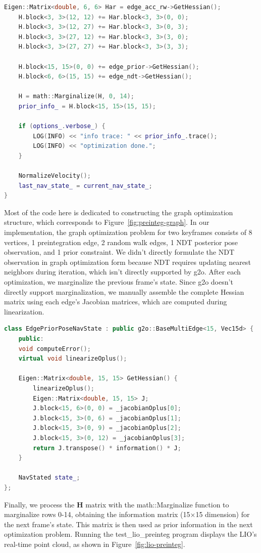 \begin{lstlisting}[language=c++,caption=src/ch8/lio-preinteg/lio_preinteg.cc]
	Eigen::Matrix<double, 6, 6> Har = edge_acc_rw->GetHessian();
	H.block<3, 3>(12, 12) += Har.block<3, 3>(0, 0);
	H.block<3, 3>(12, 27) += Har.block<3, 3>(0, 3);
	H.block<3, 3>(27, 12) += Har.block<3, 3>(3, 0);
	H.block<3, 3>(27, 27) += Har.block<3, 3>(3, 3);
	
	H.block<15, 15>(0, 0) += edge_prior->GetHessian();
	H.block<6, 6>(15, 15) += edge_ndt->GetHessian();
	
	H = math::Marginalize(H, 0, 14);
	prior_info_ = H.block<15, 15>(15, 15);
	
	if (options_.verbose_) {
		LOG(INFO) << "info trace: " << prior_info_.trace();
		LOG(INFO) << "optimization done.";
	}
	
	NormalizeVelocity();
	last_nav_state_ = current_nav_state_;
}
\end{lstlisting}

Most of the code here is dedicated to constructing the graph optimization structure, which corresponds to Figure~\ref{fig:preinteg-graph}. In our implementation, the graph optimization problem for two keyframes consists of 8 vertices, 1 preintegration edge, 2 random walk edges, 1 NDT posterior pose observation, and 1 prior constraint. We didn't directly formulate the NDT observation in graph optimization form because NDT requires updating nearest neighbors during iteration, which isn't directly supported by g2o. After each optimization, we marginalize the previous frame's state. Since g2o doesn't directly support marginalization, we manually assemble the complete Hessian matrix using each edge's Jacobian matrices, which are computed during linearization.

\begin{lstlisting}[language=c++,caption=src/common/g2o_types.h]
class EdgePriorPoseNavState : public g2o::BaseMultiEdge<15, Vec15d> {
	public:
	void computeError();
	virtual void linearizeOplus();
	
	Eigen::Matrix<double, 15, 15> GetHessian() {
		linearizeOplus();
		Eigen::Matrix<double, 15, 15> J;
		J.block<15, 6>(0, 0) = _jacobianOplus[0];
		J.block<15, 3>(0, 6) = _jacobianOplus[1];
		J.block<15, 3>(0, 9) = _jacobianOplus[2];
		J.block<15, 3>(0, 12) = _jacobianOplus[3];
		return J.transpose() * information() * J;
	}
	
	NavStated state_;
};
\end{lstlisting}

Finally, we process the $\mathbf{H}$ matrix with the math::Marginalize function to marginalize rows 0-14, obtaining the information matrix (15×15 dimension) for the next frame's state. This matrix is then used as prior information in the next optimization problem. Running the test\_lio\_preinteg program displays the LIO's real-time point cloud, as shown in Figure~\ref{fig:lio-preinteg}.


